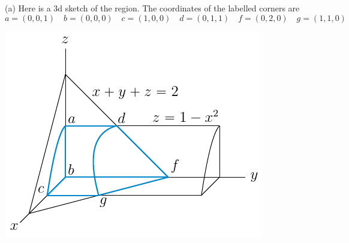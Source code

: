 \begin{solution}
(a)
Here is a 3d sketch of the region. The coordinates of the labelled corners are
\begin{equation*}
a=(0,0,1)\quad
b=(0,0,0)\quad
c=(1,0,0)\quad
d=(0,1,1)\quad
f=(0,2,0)\quad
g=(1,1,0)
\end{equation*}
\begin{center}
     \includegraphics{fig/OE01AQ8b.pdf}
\end{center}


\end{solution}
